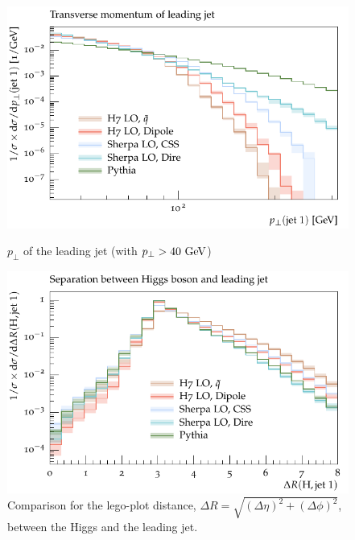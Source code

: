 \begin{figure}[h]
  \centering
  \begin{minipage}[t]{0.49\textwidth}
    \includegraphics[width=1\textwidth]{plots/H-125-MuShower/LH_H/jet1_pT.pdf}
    \caption{$p_\perp$ of the leading jet (with $p_\perp > 40~\textrm{GeV}$)}
    \label{fig:h:jet1_pt}
  \end{minipage}
  \begin{minipage}[t]{0.49\textwidth}
    \includegraphics[width=1\textwidth]{plots/H-125-MuShower/LH_H/X_jet1_dR.pdf}
    \caption{Comparison for the lego-plot distance, $\Delta R = \sqrt{(\Delta\eta)^2 + (\Delta\phi)^2}$, between the Higgs and the leading jet.}
    \label{fig:h:deltaR}
  \end{minipage}
\end{figure}

